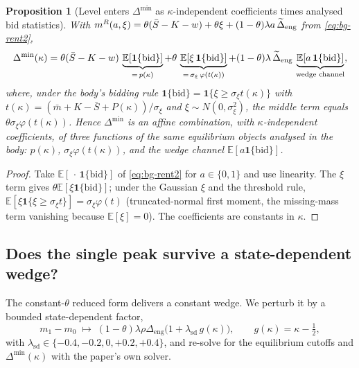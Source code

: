 \documentclass[11pt]{article}
\newtheorem{proposition}{Proposition}
\newcommand{\E}{\mathbb{E}}
\newcommand{\1}{\mathbf{1}}
\begin{document}
\begin{proposition}[Level enters $\Delta^{\min}$ as $\kappa$-independent coefficients times analysed bid statistics]
\label{prop:bg-levelshape}
With $m^{R}(a,\xi)=\theta(\bar S-K-w)+\theta\xi+(1-\theta)\lambda a\,\widetilde{\Delta}_{\mathrm{eng}}$ from \eqref{eq:bg-rent2},
\begin{equation}
  \label{eq:bg-Dmin-decomp}
  \Delta^{\min}(\kappa)
   = \theta(\bar S-K-w)\,\underbrace{\E[\1\{\mathrm{bid}\}]}_{=\,p(\kappa)}
   + \theta\,\underbrace{\E[\xi\,\1\{\mathrm{bid}\}]}_{=\,\sigma_\xi\,\varphi(t(\kappa))}
   + (1-\theta)\lambda\,\Dtil_{\mathrm{eng}}\,\underbrace{\E[a\,\1\{\mathrm{bid}\}]}_{\text{wedge channel}} ,
\end{equation}
where, under the body's bidding rule $\1\{\mathrm{bid}\}=\1\{\xi\ge\sigma_\xi t(\kappa)\}$ with $t(\kappa)=(\bar m+K-\bar S+P(\kappa))/\sigma_\xi$ and $\xi\sim N(0,\sigma_\xi^2)$, the middle term equals $\theta\sigma_\xi\varphi(t(\kappa))$. Hence $\Delta^{\min}$ is an affine combination, with $\kappa$-independent coefficients, of three functions of the \emph{same} equilibrium objects analysed in the body: $p(\kappa)$, $\sigma_\xi\varphi(t(\kappa))$, and the wedge channel $\E[a\1\{\mathrm{bid}\}]$.
\end{proposition}
\begin{proof}
Take $\E[\,\cdot\,\1\{\mathrm{bid}\}]$ of \eqref{eq:bg-rent2} for $a\in\{0,1\}$ and use linearity. The $\xi$ term gives $\theta\E[\xi\1\{\mathrm{bid}\}]$; under the Gaussian $\xi$ and the threshold rule, $\E[\xi\1\{\xi\ge\sigma_\xi t\}]=\sigma_\xi\varphi(t)$ (truncated-normal first moment, the missing-mass term vanishing because $\E[\xi]=0$). The coefficients are constants in $\kappa$.
\end{proof}

\subsection{Does the single peak survive a state-dependent wedge?}
\label{app:bg-statedep}

The constant-$\theta$ reduced form delivers a constant wedge. We perturb it by a bounded state-dependent factor,
\begin{equation}
  \label{eq:bg-statedep-form}
  m_{1}-m_{0}\;\mapsto\;(1-\theta)\lambda\rho\Delta_{\mathrm{eng}}\bigl(1+\lambda_{\mathrm{sd}}\,g(\kappa)\bigr),
  \qquad g(\kappa)=\kappa-\tfrac12,
\end{equation}
with $\lambda_{\mathrm{sd}}\in\{-0.4,-0.2,0,+0.2,+0.4\}$, and re-solve for the equilibrium cutoffs and $\Delta^{\min}(\kappa)$ with the paper's own solver.
\end{document}
